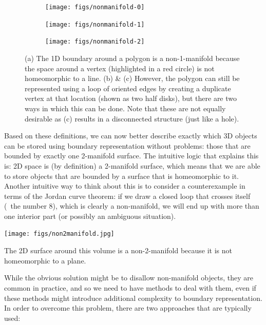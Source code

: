 \begin{figure}
\centering
\begin{subfigure}[b]{0.3\linewidth}
\texttt{[image: figs/nonmanifold-0]}
\caption{}%
\label{subfig:nonmanifold-0}
\end{subfigure}
\quad
\begin{subfigure}[b]{0.3\linewidth}
\texttt{[image: figs/nonmanifold-1]}
\caption{}%
\label{subfig:nonmanifold-1}
\end{subfigure}
\quad
\begin{subfigure}[b]{0.3\linewidth}
\texttt{[image: figs/nonmanifold-2]}
\caption{}%
\label{subfig:nonmanifold-2}
\end{subfigure}
\caption[A 1D boundary around a polygon that is non-1-manifold]{(a) The 1D boundary around a polygon is a non-1-manifold because the space around a vertex (highlighted in a red circle) is not homeomorphic to a line. (b) \& (c) However, the polygon can still be represented using a loop of oriented edges by creating a duplicate vertex at that location (shown as two half disks), but there are two ways in which this can be done.
Note that these are not equally desirable as (c) results in a disconnected structure (just like a hole).}%
\label{fig:nonmanifold}
\end{figure}

Based on these definitions, we can now better describe exactly which 3D objects can be stored using boundary representation without problems: those that are bounded by exactly one 2-manifold surface.
The intuitive logic that explains this is: 2D space is (by definition) a 2-manifold surface, which means that we are able to store objects that are bounded by a surface that is homeomorphic to it.
Another intuitive way to think about this is to consider a counterexample in terms of the Jordan curve theorem: if we draw a closed loop that crosses itself (\eg\ the number 8), which is clearly a non-manifold, we will end up with more than one interior part (or possibly an ambiguous situation).

\begin{marginfigure}
\centering
\texttt{[image: figs/non2manifold.jpg]}
\caption[A 2D surface around a volume that is non-2-manifold]{The 2D surface around this volume is a non-2-manifold because it is not homeomorphic to a plane.}%
\label{fig:non2manifold}
\end{marginfigure}

While the obvious solution might be to disallow non-manifold objects, they are common in practice, and so we need to have methods to deal with them, even if these methods might introduce additional complexity to boundary representation.
In order to overcome this problem, there are two approaches that are typically used:

